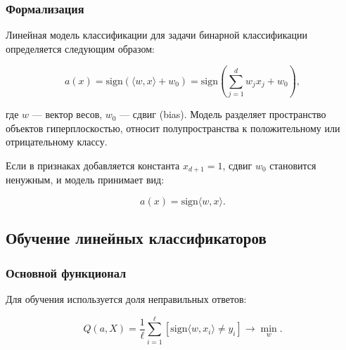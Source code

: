 \hypertarget{ux444ux43eux440ux43cux430ux43bux438ux437ux430ux446ux438ux44f}{%
\subsubsection*{Формализация}\label{ux444ux43eux440ux43cux430ux43bux438ux437ux430ux446ux438ux44f}}

Линейная модель классификации для задачи бинарной классификации
определяется следующим образом:

\begin{equation}
a(x) = \text{sign} \left( \langle w, x \rangle + w_0 \right) = \text{sign} \left( \sum_{j=1}^d w_j x_j + w_0 \right),
\end{equation}

где \(w \) --- вектор весов, \(w_0 \) --- сдвиг (bias). Модель разделяет
пространство объектов гиперплоскостью, относит полупространства к
положительному или отрицательному классу.

Если в признаках добавляется константа \(x_{d+1} = 1 \), сдвиг \(w_0\) становится ненужным, и модель принимает вид:

\begin{equation}
a(x) = \text{sign} \langle w, x \rangle.
\end{equation}

\hypertarget{ux43eux431ux443ux447ux435ux43dux438ux435-ux43bux438ux43dux435ux439ux43dux44bux445-ux43aux43bux430ux441ux441ux438ux444ux438ux43aux430ux442ux43eux440ux43eux432}{%
\subsection*{Обучение линейных
классификаторов}\label{ux43eux431ux443ux447ux435ux43dux438ux435-ux43bux438ux43dux435ux439ux43dux44bux445-ux43aux43bux430ux441ux441ux438ux444ux438ux43aux430ux442ux43eux440ux43eux432}}

\hypertarget{ux43eux441ux43dux43eux432ux43dux43eux439-ux444ux443ux43dux43aux446ux438ux43eux43dux430ux43b}{%
\subsubsection*{Основной
функционал}\label{ux43eux441ux43dux43eux432ux43dux43eux439-ux444ux443ux43dux43aux446ux438ux43eux43dux430ux43b}}

Для обучения используется доля неправильных ответов:

\begin{equation}
Q(a, X) = \frac{1}{\ell} \sum_{i=1}^\ell \left[ \text{sign} \langle w, x_i \rangle \neq y_i \right] \to \min_w.
\end{equation}

